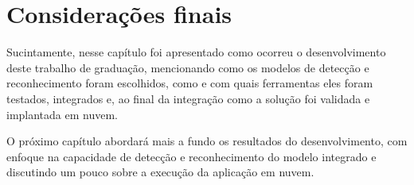 \section{Considerações finais}
Sucintamente, nesse capítulo foi apresentado como ocorreu o desenvolvimento deste trabalho de graduação, mencionando como os modelos de detecção e 
reconhecimento foram escolhidos, como e com quais ferramentas eles foram testados, integrados e, ao final da integração como a solução foi validada 
e implantada em nuvem.

O próximo capítulo abordará mais a fundo os resultados do desenvolvimento, com enfoque na capacidade de detecção e reconhecimento do modelo integrado 
e discutindo um pouco sobre a execução da aplicação em nuvem.
